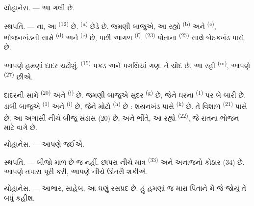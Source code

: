 \textsc{યોહાનેસ}. --- આ ગલી છે.

\textsc{સ્થપતિ}. --- ના, આ  \textsuperscript{(12)}
છે.  \textsuperscript{(a)} છેડે છે. જમણી બાજુએ, આ રહ્યો
 \textsuperscript{(b)} અને 
\textsuperscript{(c)}, ભોજનખંડની સામે 
\textsuperscript{(d)} અને  \textsuperscript{(e)} છે, પછી
આગળ  \textsuperscript{(f)}. 
\textsuperscript{(23)} પોતાના 
\textsuperscript{(25)} સાથે બેઠકખંડ પાસે છે.

આપણે હમણાં દાદર ચઢીશું.  \textsuperscript{(15)} પકડ અને
પગથિયાં ગણ. તે ચૌદ છે. આ રહી  \textsuperscript{(m)},
આપણે  \textsuperscript{(27)} છીએ.

\VUsaut{3.0mm}
\VUsaut{3.0mm}

દાદરની સામે  \textsuperscript{(20)} અને 
\textsuperscript{(j)} છે. જમણી બાજુએ સુંદર 
\textsuperscript{(g)} છે, જેને ઘરના 
\textsuperscript{(1)} પર બે બારી છે. ડાબી બાજુએ 
\textsuperscript{(1)} અને  \textsuperscript{(i)} છે,
જેને મોટો  \textsuperscript{(h)} છે : શયનખંડ પાસે
 \textsuperscript{(k)} છે. તે વિશાળ 
\textsuperscript{(21)} પાસે છે. આ અગાસી નીચે બીજું સંડાસ (20) છે, અને
ભીંતે, આ રહ્યો  \textsuperscript{(22)}, જે રાતના ભોજન માટે
વાગે છે.

\textsc{યોહાનેસ}. --- આપણે  જઈએ.

\textsc{સ્થપતિ}. --- બીજો માળ છે જ નહીં. છાપરા નીચે માત્ર
 \textsuperscript{(33)} અને અનાજનો કોઠાર (34) છે.
આપણે તપાસ પૂરી કરી, આપણે નીચે ઊતરી શકીએ.

\textsc{યોહાનેસ}. --- આભાર, સાહેબ, આ ઘણું રસપ્રદ છે. હું હમણાં જ મારા
પિતાને મેં જે જોયું તે બધું કહીશ.

\VUsaut{4.0mm}
\VUfilet{22mm}
